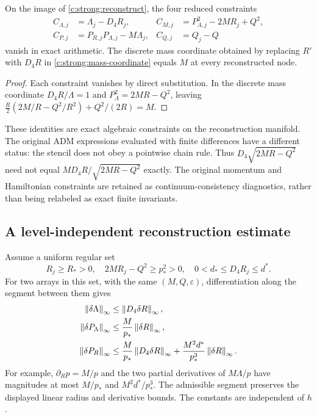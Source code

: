\begin{proposition}
On the image of \eqref{c:strong:reconstruct}, the four reduced constraints
\begin{equation}
\begin{aligned}
 C_{\Lambda,j}&=\Lambda_j-D_4R_j,&
 C_{M,j}&=P_{\Lambda,j}^2-2MR_j+Q^2,\\
 C_{P,j}&=P_{R,j}P_{\Lambda,j}-M\Lambda_j,&
 C_{Q,j}&=Q_j-Q
\end{aligned}
\end{equation}
vanish in exact arithmetic. The discrete mass coordinate obtained by replacing $R'$ with $D_4R$ in \eqref{c:strong:mass-coordinate} equals $M$ at every reconstructed node.
\end{proposition}
\begin{proof}
Each constraint vanishes by direct substitution. In the discrete mass coordinate $D_4R/\Lambda=1$ and $P_\Lambda^2=2MR-Q^2$, leaving
$\tfrac{R}{2}(2M/R-Q^2/R^2)+Q^2/(2R)=M$.
\end{proof}

These identities are exact algebraic constraints on the reconstruction manifold. The original ADM expressions evaluated with finite differences have a different status: the stencil does not obey a pointwise chain rule. Thus $D_4\sqrt{2MR-Q^2}$ need not equal $MD_4R/\sqrt{2MR-Q^2}$ exactly. The original momentum and Hamiltonian constraints are retained as continuum-consistency diagnostics, rather than being relabeled as exact finite invariants.

\subsection{A level-independent reconstruction estimate}
Assume a uniform regular set
\begin{equation}
 R_j\ge R_*>0,\quad 2MR_j-Q^2\ge p_*^2>0,
 \quad 0<d_*\le D_4R_j\le d^*.
\end{equation}
For two arrays in this set, with the same $(M,Q,\varepsilon)$, differentiation along the segment between them gives
\begin{align}
 \left\lVert\delta\Lambda\right\rVert_\infty&\le\left\lVert D_4\delta R\right\rVert_\infty,\\
 \left\lVert\delta P_\Lambda\right\rVert_\infty&\le\frac M{p_*}\left\lVert\delta R\right\rVert_\infty,\\
 \left\lVert\delta P_R\right\rVert_\infty&\le\frac M{p_*}\left\lVert D_4\delta R\right\rVert_\infty
                          +\frac{M^2d^*}{p_*^3}\left\lVert\delta R\right\rVert_\infty.
\label{c:strong:projection-bound}
\end{align}
For example, $\partial_Rp=M/p$ and the two partial derivatives of $M\Lambda/p$ have magnitudes at most $M/p_*$ and $M^2d^*/p_*^3$. The admissible segment preserves the displayed linear radius and derivative bounds. The constants are independent of $h$.

